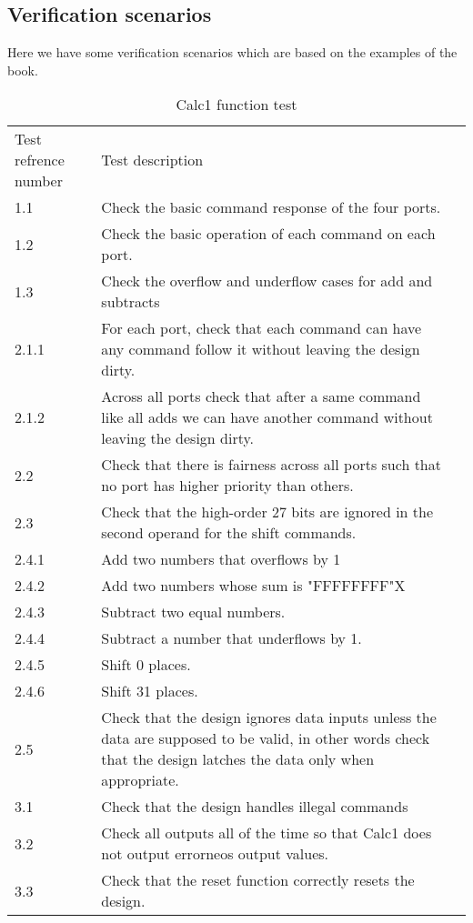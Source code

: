 \documentclass[a4paper, 11pt]{article}
\begin{document}
\subsection{Verification scenarios}
Here we have some verification scenarios which are based on the examples of the
book. \\
\begin{table}[H]
    \centering
    \begin{tabular}{lp{12cm}l}
        \toprule
        Test refrence number& Test description\\
        \cmidrule(r){1-1}\cmidrule(lr){2-2}
        1.1 & Check the basic command response of the four ports. \\
        1.2 & Check the basic operation of each command on each port.\\
        1.3 & Check the overflow and underflow cases for add and subtracts \\
        2.1.1 & For each port, check that each command can have any command
        follow it without leaving the design dirty. \\
        2.1.2 & Across all ports check that after a same command like all adds
        we can have another command without leaving the design dirty. \\
        2.2 & Check that there is fairness across all ports such that no port
        has higher priority than others. \\
        2.3 & Check that the high-order 27 bits are ignored in the second
        operand for the shift commands. \\
        2.4.1 & Add two numbers that overflows by 1 \\
        2.4.2 & Add two numbers whose sum is "FFFFFFFF"X \\
        2.4.3 & Subtract two equal numbers. \\
        2.4.4 & Subtract a number that underflows by 1. \\
        2.4.5 & Shift 0 places. \\
        2.4.6 & Shift 31 places. \\
        2.5 & Check that the design ignores data inputs unless the data are
        supposed to be valid, in other words check that the design latches the
        data only when appropriate.\\
        3.1 & Check that the design handles illegal commands\\
        3.2 & Check all outputs all of the time so that Calc1 does not output
        errorneos output values.\\
        3.3 & Check that the reset function correctly resets the design.\\
        \bottomrule
    \end{tabular}
    \caption{Calc1 function test}
    \label{table:3}
\end{table}
\end{document}
